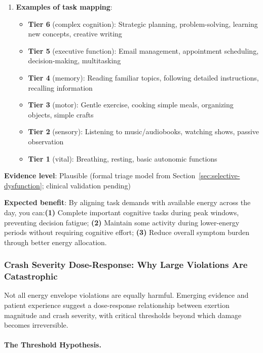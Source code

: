 \begin{recommendation}
\begin{enumerate}
    \item \textbf{Examples of task mapping}:
    \begin{itemize}
        \item \textbf{Tier 6} (complex cognition): Strategic planning, problem-solving, learning new concepts, creative writing
        \item \textbf{Tier 5} (executive function): Email management, appointment scheduling, decision-making, multitasking
        \item \textbf{Tier 4} (memory): Reading familiar topics, following detailed instructions, recalling information
        \item \textbf{Tier 3} (motor): Gentle exercise, cooking simple meals, organizing objects, simple crafts
        \item \textbf{Tier 2} (sensory): Listening to music/audiobooks, watching shows, passive observation
        \item \textbf{Tier 1} (vital): Breathing, resting, basic autonomic functions
    \end{itemize}
\end{enumerate}

\textbf{Evidence level}: Plausible (formal triage model from Section~\ref{sec:selective-dysfunction}; clinical validation pending)

\textbf{Expected benefit}: By aligning task demands with available energy across the day, you can:\textbf{(1)} Complete important cognitive tasks during peak windows, preventing decision fatigue; \textbf{(2)} Maintain some activity during lower-energy periods without requiring cognitive effort; \textbf{(3)} Reduce overall symptom burden through better energy allocation.

\end{recommendation}

\subsubsection{Crash Severity Dose-Response: Why Large Violations Are Catastrophic}
\label{subsubsec:crash-dose-response}

Not all energy envelope violations are equally harmful. Emerging evidence and patient experience suggest a dose-response relationship between exertion magnitude and crash severity, with critical thresholds beyond which damage becomes irreversible.

\paragraph{The Threshold Hypothesis.}

